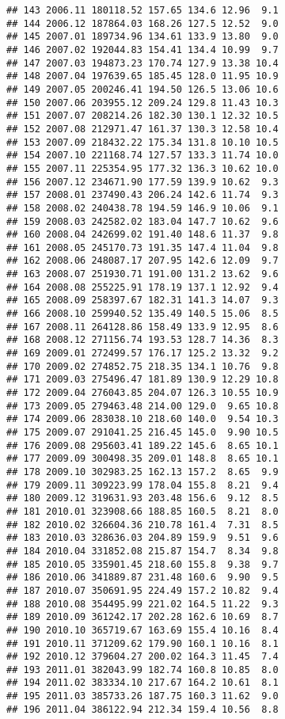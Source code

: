 \documentclass[]{article}
\begin{document}
\begin{verbatim}
## 143 2006.11 180118.52 157.65 134.6 12.96  9.1
## 144 2006.12 187864.03 168.26 127.5 12.52  9.0
## 145 2007.01 189734.96 134.61 133.9 13.80  9.0
## 146 2007.02 192044.83 154.41 134.4 10.99  9.7
## 147 2007.03 194873.23 170.74 127.9 13.38 10.4
## 148 2007.04 197639.65 185.45 128.0 11.95 10.9
## 149 2007.05 200246.41 194.50 126.5 13.06 10.6
## 150 2007.06 203955.12 209.24 129.8 11.43 10.3
## 151 2007.07 208214.26 182.30 130.1 12.32 10.5
## 152 2007.08 212971.47 161.37 130.3 12.58 10.4
## 153 2007.09 218432.22 175.34 131.8 10.10 10.5
## 154 2007.10 221168.74 127.57 133.3 11.74 10.0
## 155 2007.11 225354.95 177.32 136.3 10.62 10.0
## 156 2007.12 234671.90 177.59 139.9 10.62  9.3
## 157 2008.01 237490.43 206.24 142.6 11.74  9.3
## 158 2008.02 240438.78 194.59 146.9 10.06  9.1
## 159 2008.03 242582.02 183.04 147.7 10.62  9.6
## 160 2008.04 242699.02 191.40 148.6 11.37  9.8
## 161 2008.05 245170.73 191.35 147.4 11.04  9.8
## 162 2008.06 248087.17 207.95 142.6 12.09  9.7
## 163 2008.07 251930.71 191.00 131.2 13.62  9.6
## 164 2008.08 255225.91 178.19 137.1 12.92  9.4
## 165 2008.09 258397.67 182.31 141.3 14.07  9.3
## 166 2008.10 259940.52 135.49 140.5 15.06  8.5
## 167 2008.11 264128.86 158.49 133.9 12.95  8.6
## 168 2008.12 271156.74 193.53 128.7 14.36  8.3
## 169 2009.01 272499.57 176.17 125.2 13.32  9.2
## 170 2009.02 274852.75 218.35 134.1 10.76  9.8
## 171 2009.03 275496.47 181.89 130.9 12.29 10.8
## 172 2009.04 276043.85 204.07 126.3 10.55 10.9
## 173 2009.05 279463.48 214.00 129.0  9.65 10.8
## 174 2009.06 283038.10 218.60 140.0  9.54 10.3
## 175 2009.07 291041.25 216.45 145.0  9.90 10.5
## 176 2009.08 295603.41 189.22 145.6  8.65 10.1
## 177 2009.09 300498.35 209.01 148.8  8.65 10.1
## 178 2009.10 302983.25 162.13 157.2  8.65  9.9
## 179 2009.11 309223.99 178.04 155.8  8.21  9.4
## 180 2009.12 319631.93 203.48 156.6  9.12  8.5
## 181 2010.01 323908.66 188.85 160.5  8.21  8.0
## 182 2010.02 326604.36 210.78 161.4  7.31  8.5
## 183 2010.03 328636.03 204.89 159.9  9.51  9.6
## 184 2010.04 331852.08 215.87 154.7  8.34  9.8
## 185 2010.05 335901.45 218.60 155.8  9.38  9.7
## 186 2010.06 341889.87 231.48 160.6  9.90  9.5
## 187 2010.07 350691.95 224.49 157.2 10.82  9.4
## 188 2010.08 354495.99 221.02 164.5 11.22  9.3
## 189 2010.09 361242.17 202.28 162.6 10.69  8.7
## 190 2010.10 365719.67 163.69 155.4 10.16  8.4
## 191 2010.11 371209.62 179.90 160.1 10.16  8.1
## 192 2010.12 379604.27 200.02 164.3 11.45  7.4
## 193 2011.01 382043.99 182.74 160.8 10.85  8.0
## 194 2011.02 383334.10 217.67 164.2 10.61  8.1
## 195 2011.03 385733.26 187.75 160.3 11.62  9.0
## 196 2011.04 386122.94 212.34 159.4 10.56  8.8

\end{verbatim}
\end{document}
